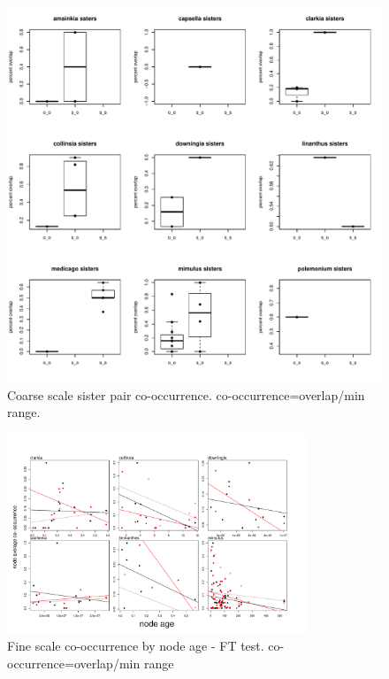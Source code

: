 \documentclass[12pt,letterpaper]{article}
\begin{document}
\begin{figure}[h!]
\caption{Coarse scale sister pair co-occurrence. co-occurrence=overlap/min range.}
\centering
\includegraphics[width=1\textwidth]{sisters_fig5}
\end{figure}

\begin{figure}[h!]
\caption{Fine scale co-occurrence by node age - FT test. co-occurrence=overlap/min range}
\centering
\includegraphics[width=0.8\textwidth]{overlap_age_FT_008_fig}
\end{figure}
\end{document}
